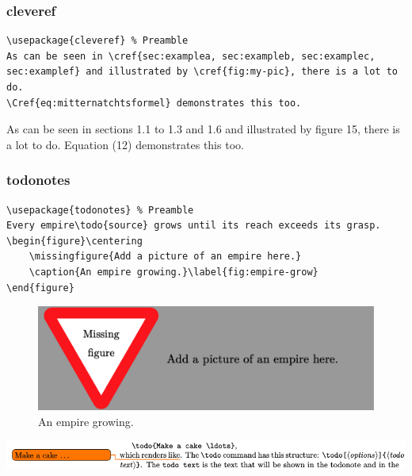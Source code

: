 \documentclass[aspectratio=169, 10pt]{beamer}
\begin{document}
\begin{frame}[fragile]
    \frametitle{cleveref}
    \begin{lstlisting}
\usepackage{cleveref} % Preamble
As can be seen in \cref{sec:examplea, sec:exampleb, sec:examplec, sec:examplef} and illustrated by \cref{fig:my-pic}, there is a lot to do.
\Cref{eq:mitternatchtsformel} demonstrates this too.
    \end{lstlisting}

    As can be seen in sections 1.1 to 1.3 and 1.6 and illustrated by figure 15, there is a lot to do.
    Equation (12) demonstrates this too.
\end{frame}

\begin{frame}[fragile]
    \frametitle{todonotes}
    \begin{lstlisting}[basicstyle=\ttfamily\footnotesize]
\usepackage{todonotes} % Preamble
Every empire\todo{source} grows until its reach exceeds its grasp.
\begin{figure}\centering
    \missingfigure{Add a picture of an empire here.}
    \caption{An empire growing.}\label{fig:empire-grow}
\end{figure}
    \end{lstlisting}

    \begin{figure}
        \centering\small
        \includegraphics[width=0.75\linewidth]{images/missfig.png}
        \caption{An empire growing.}
        \label{fig:empire-grow}
    \end{figure}

    \includegraphics[width=\linewidth]{images/todo}
\end{frame}
\end{document}

